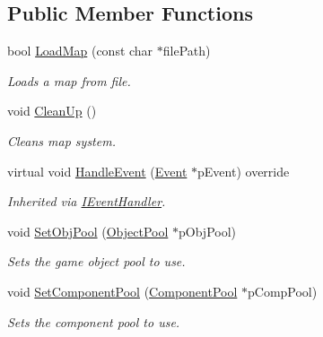 \subsection*{Public Member Functions}
\begin{DoxyCompactItemize}
\item 
\mbox{\label{class_map_system_a4469dda2eb9cda88149e398fba471844}} 
bool \mbox{\hyperlink{class_map_system_a4469dda2eb9cda88149e398fba471844}{Load\+Map}} (const char $\ast$file\+Path)
\begin{DoxyCompactList}\small\item\em Loads a map from file. \end{DoxyCompactList}\item 
\mbox{\label{class_map_system_a3dd0e0552a3366b66c6c8ddef67572b5}} 
void \mbox{\hyperlink{class_map_system_a3dd0e0552a3366b66c6c8ddef67572b5}{Clean\+Up}} ()
\begin{DoxyCompactList}\small\item\em Cleans map system. \end{DoxyCompactList}\item 
\mbox{\label{class_map_system_aa9043b7359220c63274a6d0b520bfe10}} 
virtual void \mbox{\hyperlink{class_map_system_aa9043b7359220c63274a6d0b520bfe10}{Handle\+Event}} (\mbox{\hyperlink{struct_event}{Event}} $\ast$p\+Event) override
\begin{DoxyCompactList}\small\item\em Inherited via \mbox{\hyperlink{class_i_event_handler}{I\+Event\+Handler}}. \end{DoxyCompactList}\item 
\mbox{\label{class_map_system_a0f01e1a8964dcb9ddd6364e3bccc0d95}} 
void \mbox{\hyperlink{class_map_system_a0f01e1a8964dcb9ddd6364e3bccc0d95}{Set\+Obj\+Pool}} (\mbox{\hyperlink{class_object_pool}{Object\+Pool}} $\ast$p\+Obj\+Pool)
\begin{DoxyCompactList}\small\item\em Sets the game object pool to use. \end{DoxyCompactList}\item 
\mbox{\label{class_map_system_a4e9dfbbf00c54d795785eafef680a8de}} 
void \mbox{\hyperlink{class_map_system_a4e9dfbbf00c54d795785eafef680a8de}{Set\+Component\+Pool}} (\mbox{\hyperlink{class_component_pool}{Component\+Pool}} $\ast$p\+Comp\+Pool)
\begin{DoxyCompactList}\small\item\em Sets the component pool to use. \end{DoxyCompactList}\end{DoxyCompactItemize}
